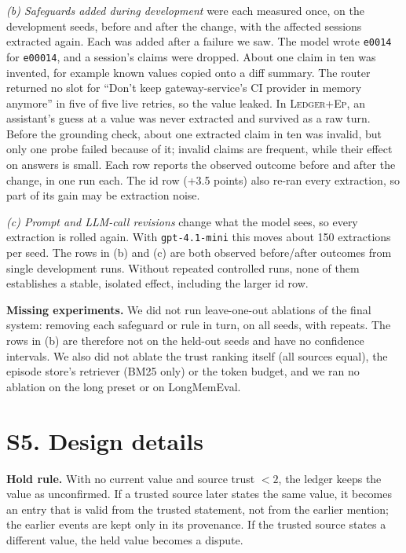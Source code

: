 \documentclass[10pt,conference]{IEEEtran}
\newcommand{\hyb}{\textsc{Ledger+Ep}}
\begin{document}
\emph{(b) Safeguards added during development} were each measured once, on
the development seeds, before and after the change, with the affected
sessions extracted again. Each was added after a failure we saw. The model
wrote \texttt{e0014} for \texttt{e00014}, and a session's claims were
dropped. About one claim in ten was invented, for example known values
copied onto a diff summary. The router returned no slot for ``Don't keep
gateway-service's CI provider in memory anymore'' in five of five live
retries, so the value leaked. In \hyb{}, an assistant's guess at a value was
never extracted and survived as a raw turn. Before the grounding check, about one extracted claim in ten was invalid, but only one probe failed because of it; invalid claims are frequent, while their effect on answers is small. Each row reports the observed outcome before and after the change, in one run each. The id row (+3.5 points) also re-ran every extraction, so part of its gain may be extraction noise.

\emph{(c) Prompt and LLM-call revisions} change what the model sees, so every
extraction is rolled again. With \texttt{gpt-4.1-mini} this moves about 150
extractions per seed. The rows in (b) and (c) are both observed before/after outcomes from single development runs. Without repeated controlled runs, none of them establishes a stable, isolated effect, including the larger id row.

\textbf{Missing experiments.} We did not run leave-one-out ablations of the
final system: removing each safeguard or rule in turn, on all seeds, with
repeats. The rows in (b) are therefore not on the held-out seeds and have no
confidence intervals. We also did not ablate the trust ranking itself (all
sources equal), the episode store's retriever (BM25 only) or the token
budget, and we ran no ablation on the long preset or on LongMemEval.

\section*{S5. Design details}
\textbf{Hold rule.} With no current value and source trust $<2$, the ledger keeps the value as unconfirmed. If a trusted source later states the same value, it becomes an entry that is valid from the trusted statement, not from the earlier mention; the earlier events are kept only in its provenance. If the trusted source states a different value, the held value becomes a dispute.
\end{document}
